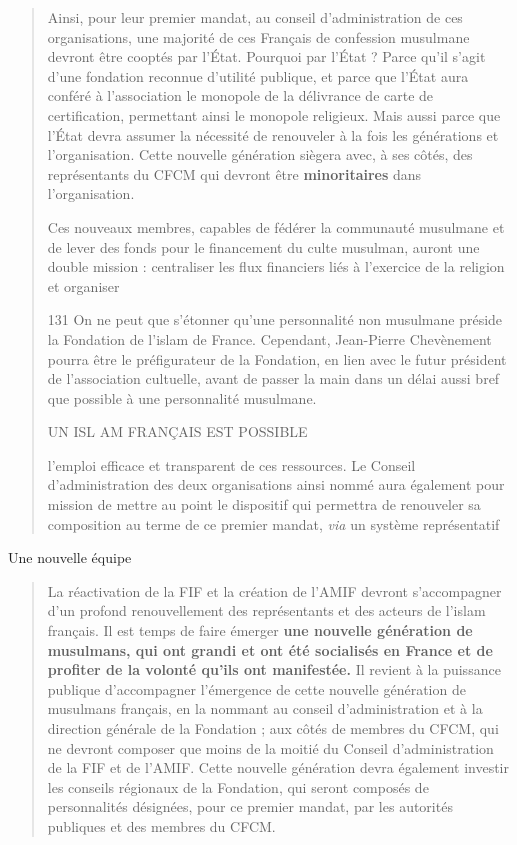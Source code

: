 \begin{quote}
Ainsi, pour leur premier mandat, au conseil d'administration de ces
organisations, une majorité de ces Français de confession musulmane
devront être cooptés par l'État. Pourquoi par l'État ? Parce qu'il
s'agit d'une fondation reconnue d'utilité publique, et parce que l'État
aura conféré à l'association le monopole de la délivrance de carte de
certification, permettant ainsi le monopole religieux. Mais aussi parce
que l'État devra assumer la nécessité de renouveler à la fois les
générations et l'organisation. Cette nouvelle génération siègera avec, à
ses côtés, des représentants du CFCM qui devront être
\textbf{minoritaires} dans l'organisation.

Ces nouveaux membres, capables de fédérer la communauté musulmane et de
lever des fonds pour le financement du culte musulman, auront une double
mission : centraliser les flux financiers liés à l'exercice de la
religion et organiser

131 On ne peut que s'étonner qu'une personnalité non musulmane préside
la Fondation de l'islam de France. Cependant, Jean-Pierre Chevènement
pourra être le préfigurateur de la Fondation, en lien avec le futur
président de l'association cultuelle, avant de passer la main dans un
délai aussi bref que possible à une personnalité musulmane.

UN ISL AM FRANÇAIS EST POSSIBLE

l'emploi efficace et transparent de ces ressources. Le Conseil
d'administration des deux organisations ainsi nommé aura également pour
mission de mettre au point le dispositif qui permettra de renouveler sa
composition au terme de ce premier mandat, \emph{via} un système
représentatif
\end{quote}

Une nouvelle équipe

\begin{quote}
La réactivation de la FIF et la création de l'AMIF devront s'accompagner
d'un profond renouvellement des représentants et des acteurs de l'islam
français. Il est temps de faire émerger \textbf{une nouvelle génération
de musulmans, qui ont grandi et ont été socialisés en France et de
profiter de la volonté qu'ils ont manifestée.} Il revient à la puissance
publique d'accompagner l'émergence de cette nouvelle génération de
musulmans français, en la nommant au conseil d'administration et à la
direction générale de la Fondation ; aux côtés de membres du CFCM, qui
ne devront composer que moins de la moitié du Conseil d'administration
de la FIF et de l'AMIF. Cette nouvelle génération devra également
investir les conseils régionaux de la Fondation, qui seront composés de
personnalités désignées, pour ce premier mandat, par les autorités
publiques et des membres du CFCM.
\end{quote}

